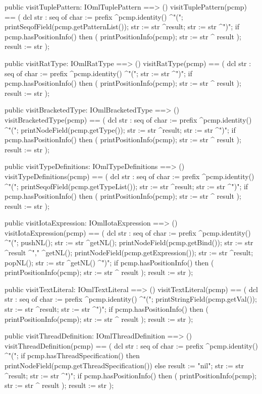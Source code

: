 \begin{vdm_al}
  public visitTuplePattern: IOmlTuplePattern ==> ()
  visitTuplePattern(pcmp) ==
    ( dcl str : seq of char := prefix ^pcmp.identity() ^"(";
      printSeqofField(pcmp.getPatternList());
      str := str ^result;
      str := str ^")";
      if pcmp.hasPositionInfo()
      then ( printPositionInfo(pcmp);
             str := str ^ result );
      result := str );

  public visitRatType: IOmlRatType ==> ()
  visitRatType(pcmp) ==
    ( dcl str : seq of char := prefix ^pcmp.identity() ^"(";
      str := str ^")";
      if pcmp.hasPositionInfo()
      then ( printPositionInfo(pcmp);
             str := str ^ result );
      result := str );

  public visitBracketedType: IOmlBracketedType ==> ()
  visitBracketedType(pcmp) ==
    ( dcl str : seq of char := prefix ^pcmp.identity() ^"(";
      printNodeField(pcmp.getType());
      str := str ^result;
      str := str ^")";
      if pcmp.hasPositionInfo()
      then ( printPositionInfo(pcmp);
             str := str ^ result );
      result := str );

  public visitTypeDefinitions: IOmlTypeDefinitions ==> ()
  visitTypeDefinitions(pcmp) ==
    ( dcl str : seq of char := prefix ^pcmp.identity() ^"(";
      printSeqofField(pcmp.getTypeList());
      str := str ^result;
      str := str ^")";
      if pcmp.hasPositionInfo()
      then ( printPositionInfo(pcmp);
             str := str ^ result );
      result := str );

  public visitIotaExpression: IOmlIotaExpression ==> ()
  visitIotaExpression(pcmp) ==
    ( dcl str : seq of char := prefix ^pcmp.identity() ^"(";
      pushNL();
      str := str ^getNL();
      printNodeField(pcmp.getBind());
      str := str ^result ^"," ^getNL();
      printNodeField(pcmp.getExpression());
      str := str ^result;
      popNL();
      str := str ^getNL() ^")";
      if pcmp.hasPositionInfo()
      then ( printPositionInfo(pcmp);
             str := str ^ result );
      result := str );

  public visitTextLiteral: IOmlTextLiteral ==> ()
  visitTextLiteral(pcmp) ==
    ( dcl str : seq of char := prefix ^pcmp.identity() ^"(";
      printStringField(pcmp.getVal());
      str := str ^result;
      str := str ^")";
      if pcmp.hasPositionInfo()
      then ( printPositionInfo(pcmp);
             str := str ^ result );
      result := str );

  public visitThreadDefinition: IOmlThreadDefinition ==> ()
  visitThreadDefinition(pcmp) ==
    ( dcl str : seq of char := prefix ^pcmp.identity() ^"(";
      if pcmp.hasThreadSpecification()
      then printNodeField(pcmp.getThreadSpecification())
      else result := "nil";
      str := str ^result;
      str := str ^")";
      if pcmp.hasPositionInfo()
      then ( printPositionInfo(pcmp);
             str := str ^ result );
      result := str );


\end{vdm_al}
